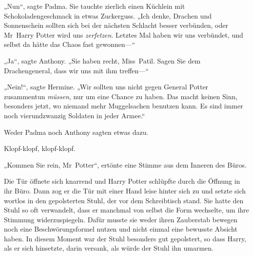 „Nun“, sagte Padma. Sie tauchte zierlich einen Küchlein mit Schokoladengeschmack in etwas Zuckerguss. „Ich denke, Drachen und Sonnenschein sollten sich bei der nächsten Schlacht besser verbünden, oder Mr~Harry Potter wird uns \emph{zerfetzen}. Letztes Mal haben wir uns verbündet, und selbst da hätte das Chaos fast gewonnen—“

„Ja“, sagte Anthony. „Sie haben recht, Miss~Patil. Sagen Sie dem Drachengeneral, dass wir uns mit ihm treffen—“

„Nein!“, sagte Hermine. „Wir sollten uns nicht gegen General Potter zusammentun \emph{müssen}, nur um eine Chance zu haben. Das macht keinen Sinn, besonders jetzt, wo niemand mehr Muggelsachen benutzen kann. Es sind immer noch vierundzwanzig Soldaten in jeder Armee.“

Weder Padma noch Anthony sagten etwas dazu.

\later

Klopf-klopf, klopf-klopf.

„Kommen Sie rein, Mr~Potter“, ertönte eine Stimme aus dem Inneren des Büros.

Die Tür öffnete sich knarrend und Harry Potter schlüpfte durch die Öffnung in ihr Büro. Dann zog er die Tür mit einer Hand leise hinter sich zu und setzte sich wortlos in den gepolsterten Stuhl, der vor dem Schreibtisch stand. Sie hatte den Stuhl so oft verwandelt, dass er manchmal von selbst die Form wechselte, um ihre Stimmung widerzuspiegeln. Dafür musste sie weder ihren Zauberstab bewegen noch eine Beschwörungsformel nutzen und nicht einmal eine bewusste Absicht haben.
In diesem Moment war der Stuhl besonders gut gepolstert, so dass Harry, als er sich hinsetzte, darin versank, als würde der Stuhl ihn umarmen.

